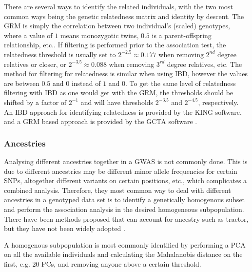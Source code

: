 There are several ways to identify the related individuals, with the two most common ways being the genetic relatedness matrix and identity by descent. The GRM is simply the correlation between two individual's (scaled) genotypes, where a value of $ 1 $ means monozygotic twins, $ 0.5 $ is a parent-offspring relationship, etc.. If filtering is performed prior to the association test, the relatedness threshold is usually set to $ 2^{-2.5} \approx 0.177 $ when removing $ 2^{nd} $ degree relatives or closer, or $ 2^{-3.5} \approx 0.088 $ when removing $ 3^{rd} $ degree relatives, etc. The method for filtering for relatedness is similar when using IBD, however the values are between $ 0.5 $ and $ 0 $ instead of $ 1 $ and $ 0 $. To get the same level of relatedness filtering with IBD as one would get with the GRM, the thresholds should be shifted by a factor of $ 2^{-1} $ and will have thresholds $ 2^{-3.5} $ and $ 2^{-4.5} $, respectively. An IBD approach for identifying relatedness is provided by the KING software\cite{manichaikul2010robust}, and a GRM based approach is provided by the GCTA software \cite{yang2011gcta}.


\subsubsection{Ancestries}   
Analysing different ancestries together in a GWAS is not commonly done. This is due to different ancestries may be different minor allele frequencies for certain SNPs, altogether different variants on certain positions, etc., which complicates a combined analysis\cite{helgason2005icelandic}. Therefore, they most common way to deal with different ancestries in a genotyped data set is to identify a genetically homogenous subset and perform the association analysis in the desired homogeneous subpopulation. There have been methods proposed that can account for ancestry such as tractor, but they have not been widely adopted \cite{atkinson2021tractor}.

A homogenous subpopulation is most commonly identified by performing a PCA on all the available individuals and calculating the Mahalanobis distance on the first, e.g. 20 PCs, and removing anyone above a certain threshold\cite{prive2020efficient}. 
